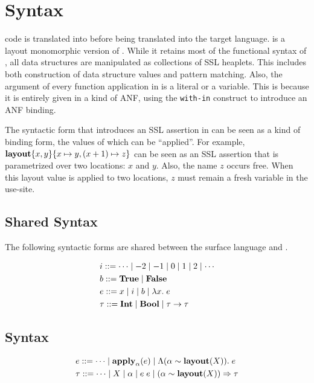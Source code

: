 \section{Syntax}

\Pika{} code is translated into \PikaCore{} before being translated into the target language. \PikaCore{}
is a layout monomorphic version of \Pika{}. While it retains most of the functional syntax of \Pika,
all data structures are manipulated as collections of SSL heaplets. This includes both construction
of data structure values and pattern matching. Also, the argument of every function application in
\PikaCore{} is a literal or a variable. This is because it is entirely given in a kind of ANF, using
the \verb|with-in| construct to introduce an ANF binding.

The syntactic form that introduces an SSL assertion in \PikaCore{} can be seen as a kind of binding
form, the values of which can be ``applied''. For example, $\textbf{layout}\{ x, y \}\{ x \mapsto y, (x+1) \mapsto z \}$
can be seen as an SSL assertion that is parametrized over two locations: $x$ and $y$. Also, the name
$z$ occurs free. When this layout value is applied to two locations, $z$ must remain a fresh variable in
the use-site.

\subsection{Shared Syntax}

The following syntactic forms are shared between the \Pika{} surface language and \PikaCore.

\begin{align*}
  &i ::= \cdots \mid -2 \mid -1 \mid 0 \mid 1 \mid 2 \mid \cdots
  \\
  &b ::= \textbf{True}{} \mid \textbf{False}
  \\
  &e ::= x \mid i \mid b \mid \lambda x.\; e
  \\
  &\tau ::= \textbf{Int} \mid \textbf{Bool} \mid \tau \rightarrow \tau
\end{align*}

\subsection{\Pika{} Syntax}
\begin{align*}
  &e ::= \cdots \mid \textbf{apply}_{\alpha}(e) \mid \Lambda (\alpha \sim \textbf{layout}(X)).\; e
  \\
  &\tau ::= \cdots \mid X \mid \alpha \mid e\; e \mid (\alpha \sim \textbf{layout}(X)) \Rightarrow \tau
\end{align*}

